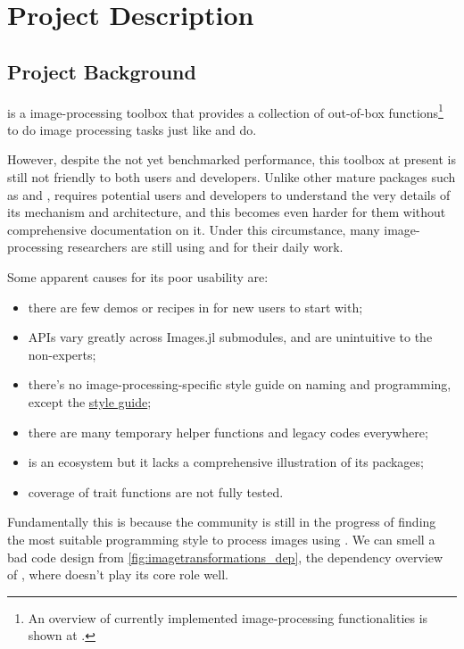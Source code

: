 
\section{Project Description}\label{sec:project}

\subsection*{Project Background}

\repoimages{} is a \langjulia image-processing toolbox that provides a collection of out-of-box functions\footnote{An overview of currently implemented image-processing functionalities is shown at \apicomparison.} to do image processing tasks just like \reposcikitimage{} and \matlabimageprocessing{} do.

However, despite the not yet benchmarked performance, this toolbox at present is still not friendly to both users and developers. Unlike other mature \langjulia{} packages such as \repojump and \repogpuarrays, \images{} requires potential users and developers to understand the very details of its mechanism and architecture, and this becomes even harder for them without comprehensive documentation on it. Under this circumstance, many image-processing researchers are still using \langpython and \langmatlab for their daily work.

Some apparent causes for its poor usability are:
\begin{itemize}
    \item there are few demos or recipes in \images{} for new users to start with;
    \item APIs vary greatly across Images.jl submodules, and are unintuitive to the non-experts;
    \item there's no image-processing-specific style guide on naming and programming, except the \langjulia{} \href{https://docs.julialang.org/en/v1/manual/style-guide/}{style guide};
    \item there are many temporary helper functions and legacy codes everywhere;
    \item \images{} is an ecosystem but it lacks a comprehensive illustration of its packages;
    \item coverage of trait functions are not fully tested.
\end{itemize}
Fundamentally this is because the community is still in the progress of finding the most suitable programming style to process images using \langjulia. We can smell a bad code design from \cref{fig:imagetransformations_dep}, the dependency overview of \imagetransformations{}, where \imagecore{} doesn't play its core role well.


